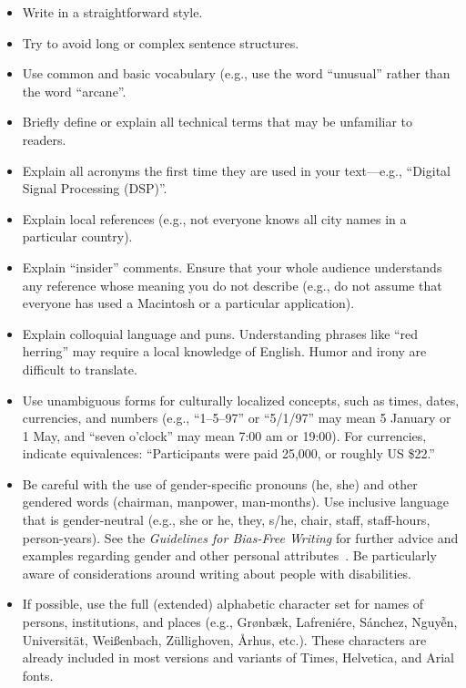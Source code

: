 \documentclass{ciis}
\begin{document}
\begin{itemize}
\item Write in a straightforward style.
\item Try to avoid long or complex sentence structures.
\item Use common and basic vocabulary (e.g., use the word ``unusual'' rather than the word ``arcane''.
\item Briefly define or explain all technical terms that may be
  unfamiliar to readers.
\item Explain all acronyms the first time they are used in your
  text---e.g., ``Digital Signal Processing (DSP)''.
\item Explain local references (e.g., not everyone knows all city
  names in a particular country).
\item Explain ``insider'' comments. Ensure that your whole audience
  understands any reference whose meaning you do not describe (e.g.,
  do not assume that everyone has used a Macintosh or a particular
  application).
\item Explain colloquial language and puns. Understanding phrases like
  ``red herring'' may require a local knowledge of English.  Humor and
  irony are difficult to translate.
\item Use unambiguous forms for culturally localized concepts, such as
  times, dates, currencies, and numbers (e.g., ``1--5--97'' or
  ``5/1/97'' may mean 5 January or 1 May, and ``seven o'clock'' may
  mean 7:00 am or 19:00). For currencies, indicate equivalences:
  ``Participants were paid {\selectfont \textwon}
  25,000, or roughly US \$22.''
\item Be careful with the use of gender-specific pronouns (he, she)
  and other gendered words (chairman, manpower, man-months). Use
  inclusive language that is gender-neutral (e.g., she or he, they,
  s/he, chair, staff, staff-hours, person-years). See the
  \textit{Guidelines for Bias-Free Writing} for further advice and
  examples regarding gender and other personal
  attributes~\cite{Schwartz:1995:GBF}. Be particularly aware of
  considerations around writing about people with disabilities.
\item If possible, use the full (extended) alphabetic character set
  for names of persons, institutions, and places (e.g.,
  Gr{\o}nb{\ae}k, Lafreni\'ere, S\'anchez, Nguy{\~{\^{e}}}n,
  Universit{\"a}t, Wei{\ss}enbach, Z{\"u}llighoven, \r{A}rhus, etc.).
  These characters are already included in most versions and variants
  of Times, Helvetica, and Arial fonts.
\end{itemize}
\end{document}
